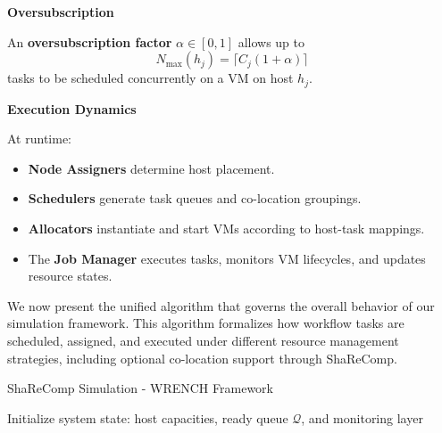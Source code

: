 \textbf{Oversubscription}

An \textbf{oversubscription factor} $\alpha \in [0,1]$ allows up to
\[
    N_{\max}(h_j) = \lceil C_j (1 + \alpha) \rceil
\]
tasks to be scheduled concurrently on a VM on host $h_j$.


\textbf{Execution Dynamics}

At runtime:
\begin{itemize}
    \item \textbf{Node Assigners} determine host placement.
    \item \textbf{Schedulers} generate task queues and co-location groupings.
    \item \textbf{Allocators} instantiate and start VMs according to host-task mappings.
    \item The \textbf{Job Manager} executes tasks, monitors VM lifecycles, and updates resource states.
\end{itemize}

We now present the unified algorithm that governs the overall behavior of our simulation framework. This algorithm formalizes how workflow tasks are scheduled, assigned, and executed under different resource management strategies, including optional co-location support through ShaReComp.

\begin{algorithm}[H]
    \caption{ShaReComp Simulation - WRENCH Framework}
    \label{alg:sharecomp_unified}

    \BlankLine
    Initialize system state: host capacities, ready queue \( \mathcal{Q} \), and monitoring layer\\

\end{algorithm}

